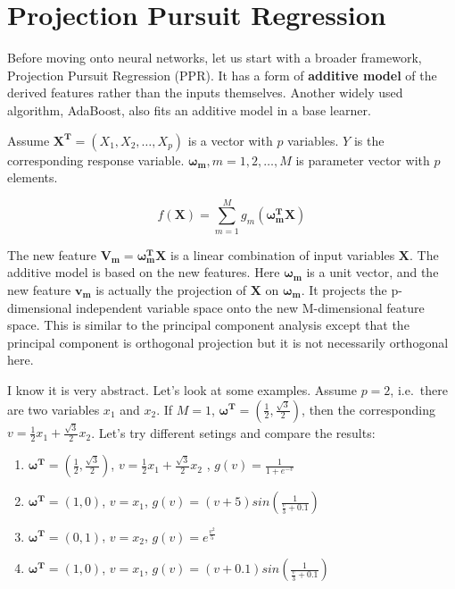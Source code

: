 \documentclass[12pt,]{krantz}
\theoremstyle{definition}
\theoremstyle{definition}
\theoremstyle{definition}
\theoremstyle{remark}
\begin{document}
\section{Projection Pursuit
Regression}\label{projection-pursuit-regression}

Before moving onto neural networks, let us start with a broader
framework, Projection Pursuit Regression (PPR). It has a form of
\textbf{additive model} of the derived features rather than the inputs
themselves. Another widely used algorithm, AdaBoost, also fits an
additive model in a base learner.

Assume \(\mathbf{X^{T}}=(X_1,X_2,\dots,X_p)\) is a vector with \(p\)
variables. \(Y\) is the corresponding response variable.
\(\mathbf{\omega_{m}},m=1,2,\dots,M\) is parameter vector with \(p\)
elements.

\[f(\mathbf{X})=\sum_{m=1}^{M}g_{m}(\mathbf{\omega_{m}^{T}X})\]

The new feature \(\mathbf{V_{m}}=\mathbf{\omega_{m}^{T}X}\) is a linear
combination of input variables \(\mathbf{X}\). The additive model is
based on the new features. Here \(\mathbf{\omega_{m}}\) is a unit
vector, and the new feature \(\mathbf{v_m}\) is actually the projection
of \(\mathbf{X}\) on \(\mathbf{\omega_{m}}\). It projects the
p-dimensional independent variable space onto the new M-dimensional
feature space. This is similar to the principal component analysis
except that the principal component is orthogonal projection but it is
not necessarily orthogonal here.

I know it is very abstract. Let's look at some examples. Assume \(p=2\),
i.e.~there are two variables \(x_1\) and \(x_2\). If \(M=1\),
\(\mathbf{\omega^{T}}=(\frac{1}{2},\frac{\sqrt{3}}{2})\), then the
corresponding \(v=\frac{1}{2}x_{1}+\frac{\sqrt{3}}{2}x_{2}\). Let's try
different setings and compare the results:

\begin{enumerate}
\def\labelenumi{\arabic{enumi}.}
\item
  \(\mathbf{\omega^{T}}=(\frac{1}{2},\frac{\sqrt{3}}{2})\),
  \(v=\frac{1}{2}x_{1}+\frac{\sqrt{3}}{2}x_{2}\) ,
  \(g(v)=\frac{1}{1+e^{-v}}\)
\item
  \(\mathbf{\omega^{T}}=(1,0)\), \(v = x_1\),
  \(g(v)=(v+5)sin(\frac{1}{\frac{v}{3}+0.1})\)
\item
  \(\mathbf{\omega^{T}}=(0,1)\), \(v = x_2\), \(g(v)=e^{\frac{v^2}{5}}\)
\item
  \(\mathbf{\omega^{T}}=(1,0)\), \(v = x_1\),
  \(g(v)=(v+0.1)sin(\frac{1}{\frac{v}{3}+0.1})\)
\end{enumerate}
\end{document}
